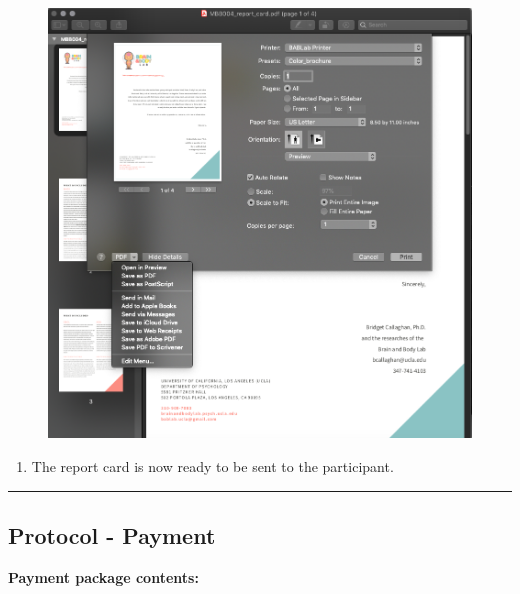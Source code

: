 \documentclass[]{book}
\providecommand{\tightlist}{%
  \setlength{\itemsep}{0pt}\setlength{\parskip}{0pt}}
\begin{document}
\begin{figure}
\centering
\includegraphics{images/report_card_online/6.png}
\caption{}
\end{figure}

\begin{enumerate}
\def\labelenumi{\arabic{enumi}.}
\setcounter{enumi}{6}
\tightlist
\item
  The report card is now ready to be sent to the participant.
\end{enumerate}

\begin{center}\rule{0.5\linewidth}{0.5pt}\end{center}

\hypertarget{protocol---payment-1}{%
\subsection{Protocol - Payment}\label{protocol---payment-1}}

\textbf{Payment package contents:}
\end{document}
